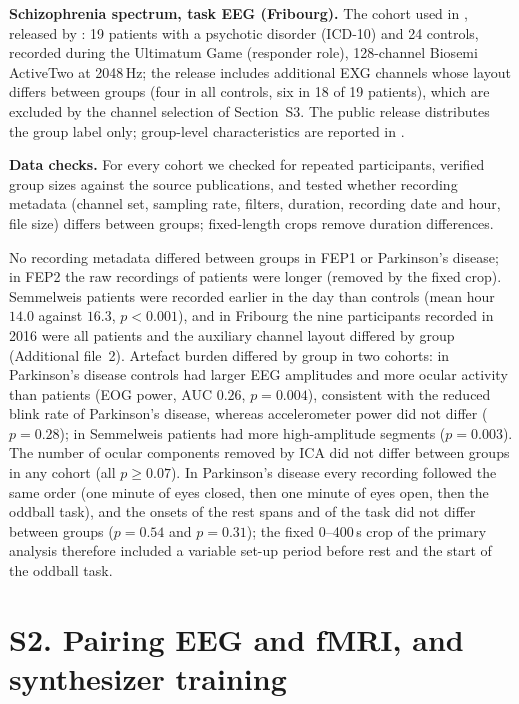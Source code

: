 \documentclass[10pt]{article}
\begin{document}
\noindent\textbf{Schizophrenia spectrum, task EEG (Fribourg).} The cohort used in \cite{calhas2023medrxiv}, released by \cite{dataset2022fribourg}: 19 patients with a psychotic disorder (ICD-10) and 24 controls, recorded during the Ultimatum Game (responder role), 128-channel Biosemi ActiveTwo at 2048\,Hz; the release includes additional EXG channels whose layout differs between groups (four in all controls, six in 18 of 19 patients), which are excluded by the channel selection of Section~S3. The public release distributes the group label only; group-level characteristics are reported in \cite{horat2018impaired}.



\noindent\textbf{Data checks.} For every cohort we checked for repeated participants, verified group sizes against the source publications, and tested whether recording metadata (channel set, sampling rate, filters, duration, recording date and hour, file size) differs between groups; fixed-length crops remove duration differences.

No recording metadata differed between groups in FEP1 or Parkinson's disease; in FEP2 the raw recordings of patients were longer (removed by the fixed crop). Semmelweis patients were recorded earlier in the day than controls (mean hour $14.0$ against $16.3$, $p<0.001$), and in Fribourg the nine participants recorded in 2016 were all patients and the auxiliary channel layout differed by group (Additional file~2). Artefact burden differed by group in two cohorts: in Parkinson's disease controls had larger EEG amplitudes and more ocular activity than patients (EOG power, AUC $0.26$, $p=0.004$), consistent with the reduced blink rate of Parkinson's disease, whereas accelerometer power did not differ ($p=0.28$); in Semmelweis patients had more high-amplitude segments ($p=0.003$). The number of ocular components removed by ICA did not differ between groups in any cohort (all $p\geq0.07$). In Parkinson's disease every recording followed the same order (one minute of eyes closed, then one minute of eyes open, then the oddball task), and the onsets of the rest spans and of the task did not differ between groups ($p=0.54$ and $p=0.31$); the fixed 0--400\,s crop of the primary analysis therefore included a variable set-up period before rest and the start of the oddball task.

\section*{S2. Pairing EEG and fMRI, and synthesizer training}
\end{document}

